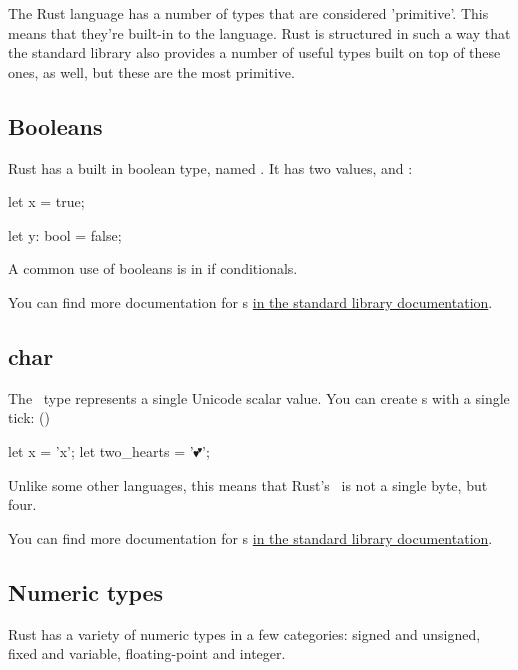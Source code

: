 The Rust language has a number of types that are considered 'primitive'. This means that they're built-in to the language. Rust is
structured in such a way that the standard library also provides a number of useful types built on top of these ones, as well, but 
these are the most primitive.

\subsection*{Booleans}

Rust has a built in boolean type, named . It has two values,  and :

\begin{rustc}
let x = true;

let y: bool = false;
\end{rustc}

A common use of booleans is in if conditionals.

\blank

You can find more documentation for s \href{https://doc.rust-lang.org/std/primitive.bool.html}{in the standard library
documentation}.

\subsection*{char}

The \varchar\ type represents a single Unicode scalar value. You can create \varchar s with a single tick: ()

\begin{rustc}
let x = 'x';
let two_hearts = '💕';
\end{rustc}

Unlike some other languages, this means that Rust's \varchar\ is not a single byte, but four.

\blank

You can find more documentation for \varchar s \href{https://doc.rust-lang.org/std/primitive.char.html}{in the standard library
documentation}.

\subsection*{Numeric types}

Rust has a variety of numeric types in a few categories: signed and unsigned, fixed and variable, floating-point and integer.

